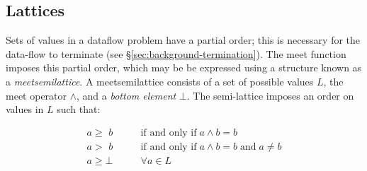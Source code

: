 \documentclass[bsc,twoside,singlespacing,parskip,logo,notimes,normalheadings]{infthesis}
\begin{document}
	\subsection{Lattices}\label{sec:background_lattices}
	Sets of values in a \gls{dataflow} problem have a partial
        order; this is necessary for the data-flow to terminate (see
        \S\ref{sec:background-termination}). The \gls{meet} function
        imposes this partial order, which may be be expressed using a
        structure known as a {\em \gls{meetsemilattice}}. A
        \gls{meetsemilattice} consists of a set of possible values
        $L$, the meet operator $\land$, and a {\em bottom element}
        $\bot$. The semi-lattice imposes an order on values in $L$
        such that:
        
        \vspace{-1cm}
        \begin{align*}
          a \ge \,\, b    & \quad\quad \text{if and only if}\; a \land b = b                         \\
          a >   \,\, b    & \quad\quad \text{if and only if}\; a \land b = b \;\text{and}\; a \neq b \\
          a \ge \bot & \quad\quad \forall a \in L\;                                             \\
        \end{align*}
        \vspace{-1cm}
\end{document}
